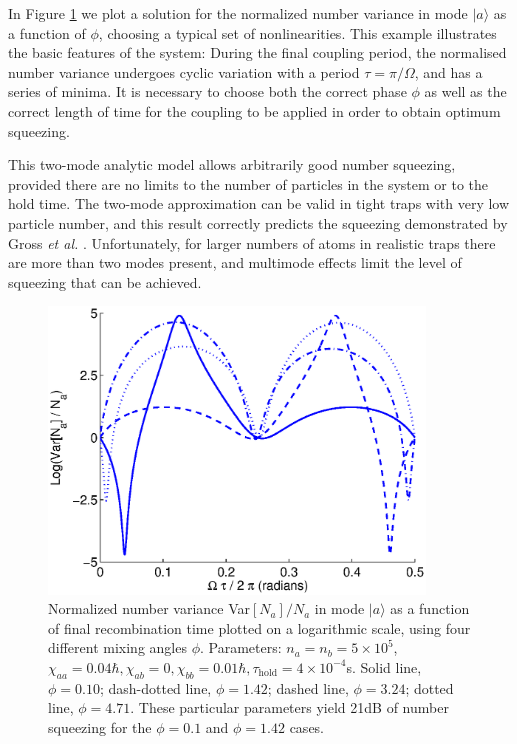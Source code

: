 \documentclass{iopart}
\begin{document}

In Figure \ref{figTwoModeAnalyticExamples} we plot a solution for the normalized number variance in mode $|a\rangle$ as a function of $\phi$, choosing a typical set of nonlinearities. This example illustrates the basic features of the system: During the final coupling period, the normalised number variance undergoes cyclic variation with a period $\tau=\pi / \Omega$, and has a series of minima. It is necessary to choose both the correct phase $\phi$ as well as the correct length of time for the coupling to be applied in order to obtain optimum squeezing.

This two-mode analytic model allows arbitrarily good number squeezing, provided there are no limits to the number of particles in the system or to the hold time. The two-mode approximation can be valid in tight traps with very low particle number, and this result correctly predicts the squeezing demonstrated by Gross \textit{et al.} \cite{Gross2010}. Unfortunately, for larger numbers of atoms in realistic traps there are more than two modes present, and multimode effects limit the level of squeezing that can be achieved.

\begin{figure}
    \centering
    \includegraphics[width=10cm]{figures/analytic_two_mode_examples.eps}
    \caption{Normalized number variance Var$[N_a]/N_a$ in mode $|a \rangle$ as a function of final recombination time plotted on a logarithmic scale, using four different mixing angles $\phi$. Parameters: $n_a = n_b =5 \times 10^5$, $\chi_{aa}=0.04 \hbar, \chi_{ab}=0, \chi_{bb}=0.01\hbar, \tau_{\mathrm{hold}}=4\times 10^{-4}$s. Solid line, $\phi=0.10$; dash-dotted line, $\phi=1.42$; dashed line, $\phi=3.24$; dotted line, $\phi=4.71$. These particular parameters yield 21dB of number squeezing for the $\phi=0.1$ and $\phi=1.42$ cases.} 
    \label{figTwoModeAnalyticExamples}
\end{figure}
\end{document}
